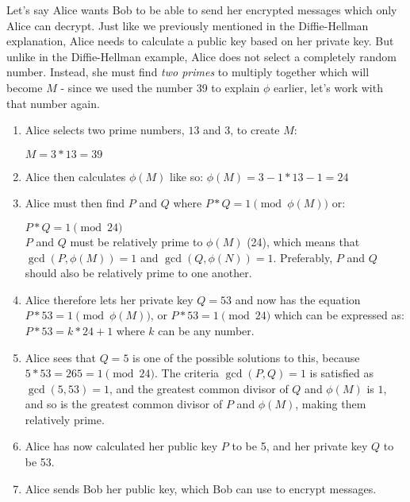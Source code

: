 Let's say Alice wants Bob to be able to send her encrypted messages which only Alice can decrypt. Just like we previously mentioned in the Diffie-Hellman explanation, Alice needs to calculate a public key based on her private key. But unlike in the Diffie-Hellman example, Alice does not select a completely random number. Instead, she must find \textit{two primes} to multiply together which will become $M$ - since we used the number 39 to explain $\phi$ earlier, let's work with that number again.
\begin{enumerate}
	\item Alice selects two prime numbers, $13$ and $3$, to create $M$:

\indent $M = 3*13 = 39$

	\item Alice then calculates $\phi(M)$ like so:
\indent $\phi(M) = 3-1 * 13-1 = 24$
 
	\item Alice must then find $P$ and $Q$ where $P*Q = 1 \pmod{\phi(M)}$ or:

\indent $P*Q = 1 \pmod{24}$ \\

$P$ and $Q$ must be relatively prime to $\phi(M)$ (24), which means that $\gcd(P,\phi(M)) = 1$ and $\gcd(Q,\phi(N)) = 1$. Preferably, $P$ and $Q$ should also be relatively prime to one another.\\

	\item Alice therefore lets her private key $Q = 53$ and now has the equation $ P*53 = 1 \pmod{\phi(M)}$, or $P*53 = 1 \pmod{24}$ which can be expressed as:
$P*53 = k * 24 +1$ where $k$ can be any number.

	\item Alice sees that $Q = 5$ is one of the possible solutions to this, because $5*53 = 265 = 1 \pmod{24}$. The criteria $\gcd(P,Q) = 1$ is satisfied as $\gcd(5,53) = 1$, and the greatest common divisor of $Q$ and $\phi(M)$ is $1$, and so is the greatest common divisor of $P$ and $\phi(M)$, making them relatively prime.

	\item Alice has now calculated her public key $P$ to be 5, and her private key $Q$ to be 53.

	\item Alice sends Bob her public key, which Bob can use to encrypt messages.
	
\end{enumerate} 

